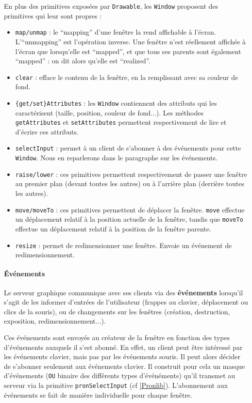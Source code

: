 En plus des primitives exposées par \verb|Drawable|, les \verb|Window| proposent des primitives qui leur sont propres :
\begin{itemize}
  \item \verb|map/unmap| : le ``mapping'' d'une fenêtre la rend affichable à l'écran. L'``unmapping'' est l'opération inverse. Une fenêtre n'est réellement affichée à l'écran que lorsqu'elle est ``mapped'', et que tous ses parents sont également ``mapped'' : on dit alors qu'elle est ``realized''.
  \item \verb|clear| : efface le contenu de la fenêtre, en la remplissant avec sa couleur de fond.
  \item \verb|{get/set}Attributes| : les \verb|Window| contiennent des attributs qui les caractérisent (taille, position, couleur de fond...). Les méthodes \verb|getAttributes| et \verb|setAttributes| permettent respectivement de lire et d'écrire ces attributs.
  \item \verb|selectInput| : permet à un client de s'abonner à des événements pour cette \verb|Window|. Nous en reparlerons dans le paragraphe sur les événements.
  \item \verb|raise/lower| : ces primitives permettent respectivement de passer une fenêtre au premier plan (devant toutes les autres) ou à l'arrière plan (derrière toutes les autres).
  \item \verb|move/moveTo| : ces primitives permettent de déplacer la fenêtre. \verb|move| effectue un déplacement relatif à la position actuelle de la fenêtre, tandis que \verb|moveTo| effectue un déplacement relatif à la position de la fenêtre parente.
  \item \verb|resize| : permet de redimensionner une fenêtre. Envoie un événement de redimensionnement.
\end{itemize}

\paragraph{Événements}\label{evenements}
Le serveur graphique communique avec ses clients via des \textbf{événements} lorsqu'il s'agit de les informer d'entrées de l'utilisateur (frappes au clavier, déplacement ou clics de la souris), ou de changements sur les fenêtres (création, destruction, exposition, redimensionnement...).

Ces événements sont envoyés au créateur de la fenêtre en fonction des types d'événements auxquels il s'est abonné. En effet, un client peut être intéressé par les événements clavier, mais pas par les événements souris. Il peut alors décider de s'abonner seulement aux événements clavier. Il construit pour cela un masque d'événements (\verb|OU| binaire des différents types d'événéments) qu'il transmet au serveur via la primitive \verb|pronSelectInput| (cf \ref{Pronlib}). L'abonnement aux événements se fait de manière individuelle pour chaque fenêtre.

